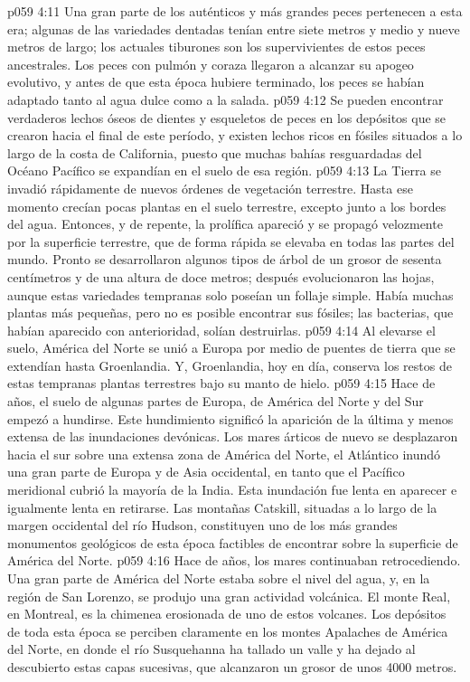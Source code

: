 \vs p059 4:11 Una gran parte de los auténticos y más grandes peces pertenecen a esta era; algunas de las variedades dentadas tenían entre siete metros y medio y nueve metros de largo; los actuales tiburones son los supervivientes de estos peces ancestrales. Los peces con pulmón y coraza llegaron a alcanzar su apogeo evolutivo, y antes de que esta época hubiere terminado, los peces se habían adaptado tanto al agua dulce como a la salada.
\vs p059 4:12 Se pueden encontrar verdaderos lechos óseos de dientes y esqueletos de peces en los depósitos que se crearon hacia el final de este período, y existen lechos ricos en fósiles situados a lo largo de la costa de California, puesto que muchas bahías resguardadas del Océano Pacífico se expandían en el suelo de esa región.
\vs p059 4:13 La Tierra se invadió rápidamente de nuevos órdenes de vegetación terrestre. Hasta ese momento crecían pocas plantas en el suelo terrestre, excepto junto a los bordes del agua. Entonces, y de repente, la prolífica  apareció y se propagó velozmente por la superficie terrestre, que de forma rápida se elevaba en todas las partes del mundo. Pronto se desarrollaron algunos tipos de árbol de un grosor de sesenta centímetros y de una altura de doce metros; después evolucionaron las hojas, aunque estas variedades tempranas solo poseían un follaje simple. Había muchas plantas más pequeñas, pero no es posible encontrar sus fósiles; las bacterias, que habían aparecido con anterioridad, solían destruirlas.
\vs p059 4:14 Al elevarse el suelo, América del Norte se unió a Europa por medio de puentes de tierra que se extendían hasta Groenlandia. Y, Groenlandia, hoy en día, conserva los restos de estas tempranas plantas terrestres bajo su manto de hielo.
\vs p059 4:15 \pc Hace  de años, el suelo de algunas partes de Europa, de América del Norte y del Sur empezó a hundirse. Este hundimiento significó la aparición de la última y menos extensa de las inundaciones devónicas. Los mares árticos de nuevo se desplazaron hacia el sur sobre una extensa zona de América del Norte, el Atlántico inundó una gran parte de Europa y de Asia occidental, en tanto que el Pacífico meridional cubrió la mayoría de la India. Esta inundación fue lenta en aparecer e igualmente lenta en retirarse. Las montañas Catskill, situadas a lo largo de la margen occidental del río Hudson, constituyen uno de los más grandes monumentos geológicos de esta época factibles de encontrar sobre la superficie de América del Norte.
\vs p059 4:16 \pc Hace  de años, los mares continuaban retrocediendo. Una gran parte de América del Norte estaba sobre el nivel del agua, y, en la región de San Lorenzo, se produjo una gran actividad volcánica. El monte Real, en Montreal, es la chimenea erosionada de uno de estos volcanes. Los depósitos de toda esta época se perciben claramente en los montes Apalaches de América del Norte, en donde el río Susquehanna ha tallado un valle y ha dejado al descubierto estas capas sucesivas, que alcanzaron un grosor de unos 4000 metros.
